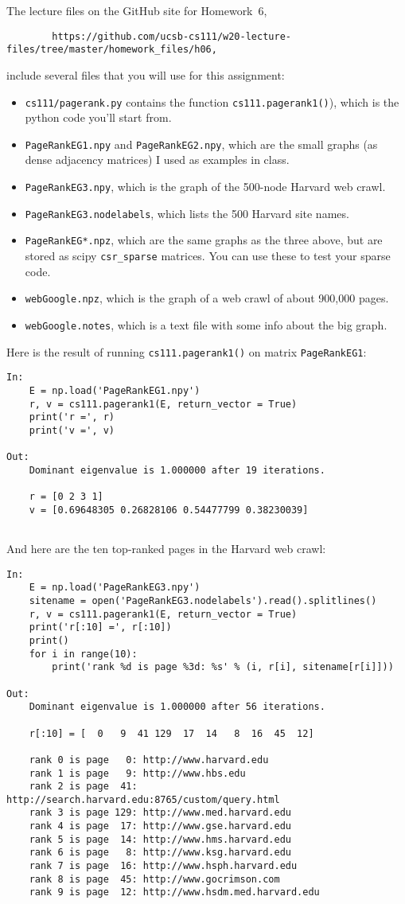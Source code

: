 \documentclass[11pt]{article}
\begin{document}
The lecture files on the GitHub site for Homework~6,
\begin{verbatim}
        https://github.com/ucsb-cs111/w20-lecture-files/tree/master/homework_files/h06,
\end{verbatim}
include several files that you will use for this assignment:
\begin{itemize}
\item{\tt cs111/pagerank.py} contains the function {\tt cs111.pagerank1()}), 
which is the python code you'll start from.
\item{\tt PageRankEG1.npy} and {\tt PageRankEG2.npy}, which are the small
   graphs (as dense adjacency matrices) I used as examples in class.
\item{\tt PageRankEG3.npy}, which is the graph of the 500-node Harvard web crawl.
\item{\tt PageRankEG3.nodelabels}, which lists the 500 Harvard site names.
\item{\tt PageRankEG*.npz}, which are the same graphs as the three above, but
   are stored as scipy {\tt csr\_sparse} matrices. You can use these to test
   your sparse code.
\item{\tt webGoogle.npz}, which is the graph of a web crawl of about 900,000 pages.
\item{\tt webGoogle.notes}, which is a text file with some info about the big graph.
\end{itemize}
Here is the result of running {\tt cs111.pagerank1()} on matrix {\tt PageRankEG1}:
\begin{verbatim}
In:
    E = np.load('PageRankEG1.npy')
    r, v = cs111.pagerank1(E, return_vector = True)
    print('r =', r)
    print('v =', v)

Out:
    Dominant eigenvalue is 1.000000 after 19 iterations.
    
    r = [0 2 3 1]
    v = [0.69648305 0.26828106 0.54477799 0.38230039]


\end{verbatim}
And here are the ten top-ranked pages in the Harvard web crawl:
\begin{verbatim}
In:
    E = np.load('PageRankEG3.npy')
    sitename = open('PageRankEG3.nodelabels').read().splitlines()
    r, v = cs111.pagerank1(E, return_vector = True)
    print('r[:10] =', r[:10])
    print()
    for i in range(10):
        print('rank %d is page %3d: %s' % (i, r[i], sitename[r[i]]))

Out:
    Dominant eigenvalue is 1.000000 after 56 iterations.
    
    r[:10] = [  0   9  41 129  17  14   8  16  45  12]
    
    rank 0 is page   0: http://www.harvard.edu
    rank 1 is page   9: http://www.hbs.edu
    rank 2 is page  41: http://search.harvard.edu:8765/custom/query.html
    rank 3 is page 129: http://www.med.harvard.edu
    rank 4 is page  17: http://www.gse.harvard.edu
    rank 5 is page  14: http://www.hms.harvard.edu
    rank 6 is page   8: http://www.ksg.harvard.edu
    rank 7 is page  16: http://www.hsph.harvard.edu
    rank 8 is page  45: http://www.gocrimson.com
    rank 9 is page  12: http://www.hsdm.med.harvard.edu
\end{verbatim}
\end{document}
